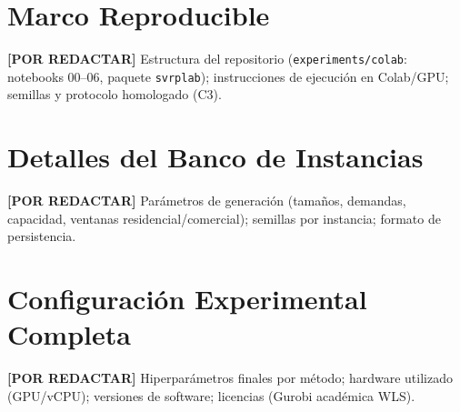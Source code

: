 \documentclass[12pt]{report}
\newcommand{\pendiente}[1]{\par\noindent\colorbox{lightbg}{%
  \begin{minipage}{0.94\linewidth}\small
  \textcolor{uanlgold}{\textbf{[POR REDACTAR]}} #1
  \end{minipage}}\par\medskip}
\begin{document}
\appendix

\chapter{Marco Reproducible}\label{ap:reproducible}
\pendiente{Estructura del repositorio (\texttt{experiments/colab}: notebooks
00--06, paquete \texttt{svrplab}); instrucciones de ejecuci\'on en Colab/GPU;
semillas y protocolo homologado (C3).}

\chapter{Detalles del Banco de Instancias}\label{ap:instancias}
\pendiente{Par\'ametros de generaci\'on (tama\~nos, demandas, capacidad,
ventanas residencial/comercial); semillas por instancia; formato de
persistencia.}

\chapter{Configuraci\'on Experimental Completa}\label{ap:config}
\pendiente{Hiperpar\'ametros finales por m\'etodo; hardware utilizado (GPU/vCPU);
versiones de software; licencias (Gurobi acad\'emica WLS).}

\printbibliography[title={Bibliograf\'ia}]
\end{document}
